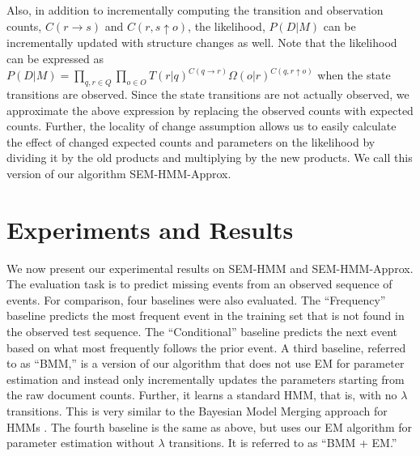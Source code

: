 \documentclass[letterpaper]{article}
\begin{document}
Also, in addition to incrementally computing the transition and observation counts, $C(r \rightarrow s)$ and $C(r,s \uparrow o)$, the likelihood, $P(D|M)$ can be incrementally updated with structure changes as well. Note that the likelihood can be expressed as $P(D|M) = \prod_{q, r \in Q} \prod_{o \in O} T(r|q)^{C(q \rightarrow r)} \Omega(o|r)^{C(q,r \uparrow o)}$ when the state transitions are observed. Since the state transitions are not actually observed, we approximate the above expression by replacing the observed counts with expected counts. Further, the locality of change assumption allows us to easily
calculate the effect of changed expected counts and parameters on the likelihood by dividing it by the old products and multiplying by the new products. We call this version of our algorithm SEM-HMM-Approx.

\section{Experiments and Results}

We now present our experimental results on SEM-HMM and SEM-HMM-Approx. The
evaluation task is to predict missing events from an observed sequence of events.
For comparison, four baselines were also evaluated.  The ``Frequency'' baseline predicts the most frequent event in the training set that is not found in the observed test sequence. The ``Conditional'' baseline predicts the next event based on what most frequently follows the prior event.  %
\vspace{-3.41mm}
\vspace{-3.41mm}
\vspace{-3.34mm}
A third baseline, referred to as ``BMM,'' is a version of our algorithm that does not use EM for parameter estimation and instead only incrementally updates the parameters starting from the raw document counts. Further, it learns a standard HMM, that is, with no $\lambda$ transitions.
This is very similar to the Bayesian Model Merging approach for HMMs \cite{stolcke1994best}.
The fourth baseline is the same as above, but uses our EM algorithm for parameter estimation without $\lambda$ transitions. It is referred to as ``BMM + EM.''
\end{document}
